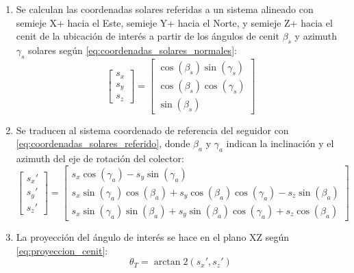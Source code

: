 \begin{enumerate}
    \item Se calculan las coordenadas solares referidas a un sistema alineado con semieje X+ hacia el Este, semieje Y+ hacia el Norte, y semieje Z+ hacia el cenit de la ubicación de interés a partir de los ángulos de cenit $\beta_s$ y azimuth $\gamma_s$ solares según \ref{eq:coordenadas_solares_normales}:
          \begin{equation} \label{eq:coordenadas_solares_normales}
              \begin{bmatrix}
                  s_x \\
                  s_y \\
                  s_z
              \end{bmatrix} = \begin{bmatrix}
                  \cos(\beta_s) \sin(\gamma_s) \\
                  \cos(\beta_s) \cos(\gamma_s) \\
                  \sin(\beta_s)
              \end{bmatrix}
          \end{equation}
    \item Se traducen al sistema coordenado de referencia del seguidor con \ref{eq:coordenadas_solares_referido}, donde $\beta_a$ y $\gamma_a$ indican la inclinación y el azimuth del eje de rotación del colector:
          \begin{equation} \label{eq:coordenadas_solares_referido}
              \begin{bmatrix}
                  s_x\prime \\
                  s_y\prime \\
                  s_z\prime
              \end{bmatrix} = \begin{bmatrix}
                  s_x \cos(\gamma_a) - s_y \sin(\gamma_a)                                                 \\
                  s_x \sin(\gamma_a) \cos(\beta_a) + s_y \cos(\beta_a) \cos(\gamma_a) - s_z \sin(\beta_a) \\
                  s_x \sin(\gamma_a) \sin(\beta_a) + s_y \sin(\beta_a) \cos(\gamma_a) + s_z \cos(\beta_a)
              \end{bmatrix}
          \end{equation}
    \item La proyección del ángulo de interés se hace en el plano XZ según \ref{eq:proyeccion_cenit}:
          \begin{equation} \label{eq:proyeccion_cenit}
              \theta_T = \arctan2(s_x\prime, s_z\prime)
          \end{equation}
\end{enumerate}

